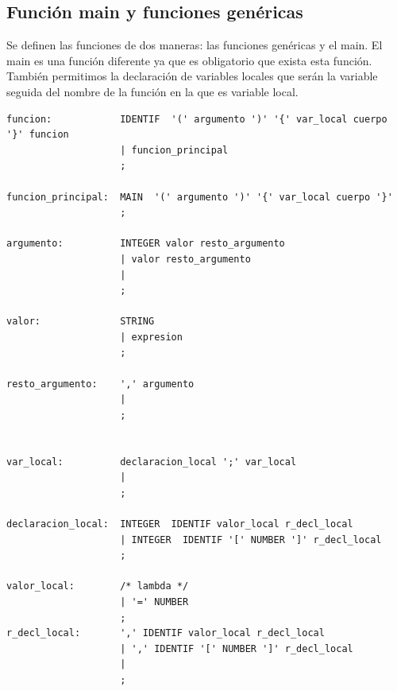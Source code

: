 \documentclass[12pt,a4paper]{article}
\begin{document}
\subsection{Función main y funciones genéricas}
\noindent Se definen las funciones de dos maneras: las funciones genéricas y el main. El main es una función 
diferente ya que es obligatorio que exista esta función. También permitimos la declaración de variables locales 
que serán la variable seguida del nombre de la función en la que es variable local.
\begin{lstlisting}
funcion:            IDENTIF  '(' argumento ')' '{' var_local cuerpo '}' funcion  
                    | funcion_principal                                            
                    ;

funcion_principal:  MAIN  '(' argumento ')' '{' var_local cuerpo '}'               
                    ;

argumento:          INTEGER valor resto_argumento                    
                    | valor resto_argumento                       
                    |                                               
                    ;

valor:              STRING                                           
                    | expresion                                      
                    ;

resto_argumento:    ',' argumento                                 
                    |                                              
                    ;   


var_local:          declaracion_local ';' var_local               
                    |                                              
                    ;

declaracion_local:  INTEGER  IDENTIF valor_local r_decl_local       
                    | INTEGER  IDENTIF '[' NUMBER ']' r_decl_local  
                    ;

valor_local:        /* lambda */                                    
                    | '=' NUMBER                                    
                    ;
r_decl_local:       ',' IDENTIF valor_local r_decl_local            
                    | ',' IDENTIF '[' NUMBER ']' r_decl_local        
                    |                                              
                    ;
\end{lstlisting}
\end{document}
